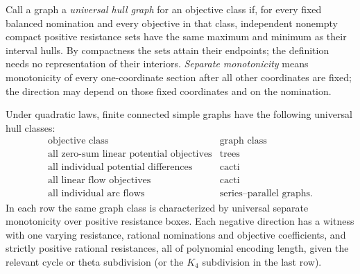 Call a graph a \emph{universal hull graph} for an objective class if, for
every fixed balanced nomination and every objective in that class,
independent nonempty compact positive resistance sets have the same
maximum and minimum as their interval hulls. By compactness the sets
attain their endpoints; the definition needs no representation of their
interiors. \emph{Separate monotonicity} means monotonicity of every
one-coordinate section after all other coordinates are fixed; the
direction may depend on those fixed coordinates and on the nomination.

\begin{theorem}
\label{thm:a-weight-hierarchy}
Under quadratic laws, finite connected simple graphs have the following
universal hull classes:
\[
\begin{array}{c|c}
\text{objective class}&\text{graph class}\\ \hline
\text{all zero-sum linear potential objectives}&\text{trees}\\
\text{all individual potential differences}&\text{cacti}\\
\text{all linear flow objectives}&\text{cacti}\\
\text{all individual arc flows}&\text{series--parallel graphs}.
\end{array}
\]
In each row the same graph class is characterized by universal separate
monotonicity over positive resistance boxes. Each negative direction has
a witness with one varying resistance, rational nominations and objective
coefficients, and strictly positive rational resistances, all of polynomial
encoding length, given the relevant cycle or theta subdivision
(or the $K_4$ subdivision in the last row).
\end{theorem}
